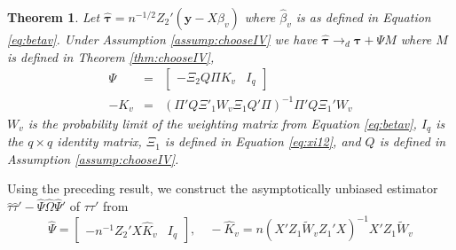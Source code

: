 \documentclass[12pt]{article}
\newtheorem{thm}{Theorem}[section]
\theoremstyle{definition}
\begin{document}
\begin{thm}
Let $\widehat{\boldsymbol{\tau}} = n^{-1/2} Z_2' ( \mathbf{y} - X\widehat{\beta}_v)$ where $\widehat{\beta}_v$ is as defined in Equation \ref{eq:betav}. Under Assumption \ref{assump:chooseIV} we have
$\widehat{\boldsymbol{\tau}} \rightarrow_d \boldsymbol{\tau} + \Psi M$
where $M$ is defined in Theorem \ref{thm:chooseIV},
\begin{eqnarray*}
	\Psi &=&\left[ \begin{array}{cc}-\Xi_2Q \Pi K_v  & I_{q} \end{array}\right] \\
	-K_v &=& \left(\Pi' Q \Xi'_1 W_v \Xi_1 Q'\Pi\right)^{-1} \Pi'Q \Xi_1' W_v
\end{eqnarray*}
$W_v$ is the probability limit of the weighting matrix from Equation \ref{eq:betav}, $I_q$ is the $q\times q$ identity matrix, $\Xi_1$ is defined in Equation \ref{eq:xi12},  and $Q$ is defined in Assumption \ref{assump:chooseIV}.
\end{thm}
Using the preceding result, we construct the asymptotically unbiased estimator $\widehat{\tau}\widehat{\tau}' - \widehat{\Psi}\widehat{\Omega} \widehat{\Psi}'$ of $\tau\tau'$ from
	$$\widehat{\Psi} = \left[ \begin{array}
		{cc}
		-n^{-1}Z_2'X \widehat{K}_v & I_q
	\end{array}\right], \quad -\widehat{K}_v = n\left(X'Z_1 \widetilde{W}_v Z_1' X\right)^{-1}X'Z_1 \widetilde{W}_v$$
\end{document}
